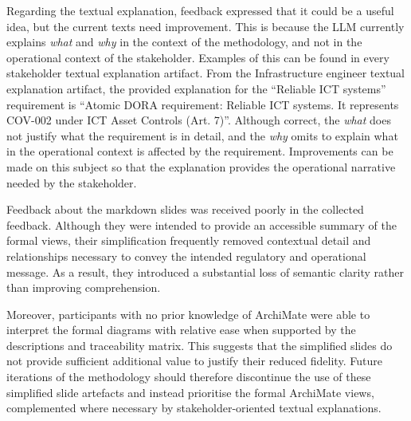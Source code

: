 Regarding the textual explanation, feedback expressed that it could be a useful idea, but the current texts need improvement. This is because the \ac{LLM} currently explains \textit{what} and \textit{why} in the context of the methodology, and not in the operational context of the stakeholder. Examples of this can be found in every stakeholder textual explanation artifact. From the Infrastructure engineer textual explanation artifact, the provided explanation for the ``Reliable \ac{ICT} systems'' requirement is ``Atomic DORA requirement: Reliable ICT systems. It represents COV-002 under ICT Asset Controls (Art. 7)''. Although correct, the \textit{what} does not justify what the requirement is in detail, and the \textit{why} omits to explain what in the operational context is affected by the requirement. Improvements can be made on this subject so that the explanation provides the operational narrative needed by the stakeholder.

Feedback about the markdown slides was received poorly in the collected feedback. Although they were intended to provide an accessible summary of the formal views, their simplification frequently removed contextual detail and relationships necessary to convey the intended regulatory and operational message. As a result, they introduced a substantial loss of semantic clarity rather than improving comprehension.

Moreover, participants with no prior knowledge of ArchiMate were able to interpret the formal diagrams with relative ease when supported by the descriptions and traceability matrix. This suggests that the simplified slides do not provide sufficient additional value to justify their reduced fidelity. Future iterations of the methodology should therefore discontinue the use of these simplified slide artefacts and instead prioritise the formal ArchiMate views, complemented where necessary by stakeholder-oriented textual explanations.


